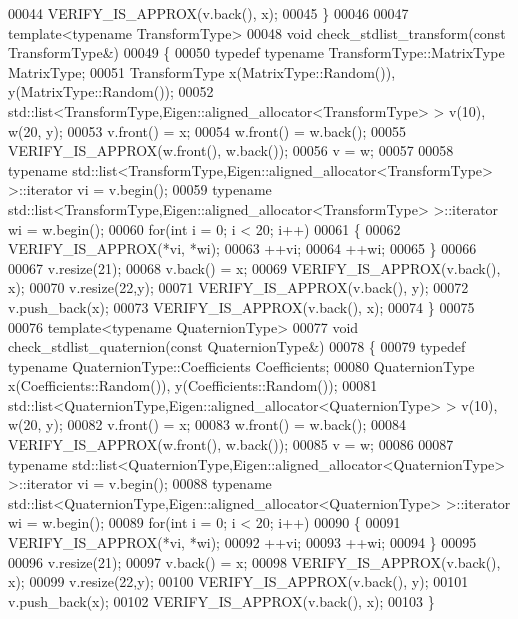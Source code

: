 \begin{DoxyCode}
00044   VERIFY\_IS\_APPROX(v.back(), x);
00045 \}
00046 
00047 \textcolor{keyword}{template}<\textcolor{keyword}{typename} TransformType>
00048 \textcolor{keywordtype}{void} check\_stdlist\_transform(\textcolor{keyword}{const} TransformType&)
00049 \{
00050   \textcolor{keyword}{typedef} \textcolor{keyword}{typename} TransformType::MatrixType MatrixType;
00051   TransformType x(MatrixType::Random()), y(MatrixType::Random());
00052   std::list<TransformType,Eigen::aligned\_allocator<TransformType> > v(10), w(20, y);
00053   v.front() = x;
00054   w.front() = w.back();
00055   VERIFY\_IS\_APPROX(w.front(), w.back());
00056   v = w;
00057 
00058   \textcolor{keyword}{typename} std::list<TransformType,Eigen::aligned\_allocator<TransformType> >::iterator vi = v.begin();
00059   \textcolor{keyword}{typename} std::list<TransformType,Eigen::aligned\_allocator<TransformType> >::iterator wi = w.begin();
00060   \textcolor{keywordflow}{for}(\textcolor{keywordtype}{int} i = 0; i < 20; i++)
00061   \{
00062     VERIFY\_IS\_APPROX(*vi, *wi);
00063     ++vi;
00064     ++wi;
00065   \}
00066 
00067   v.resize(21);
00068   v.back() = x;
00069   VERIFY\_IS\_APPROX(v.back(), x);
00070   v.resize(22,y);
00071   VERIFY\_IS\_APPROX(v.back(), y);
00072   v.push\_back(x);
00073   VERIFY\_IS\_APPROX(v.back(), x);
00074 \}
00075 
00076 \textcolor{keyword}{template}<\textcolor{keyword}{typename} QuaternionType>
00077 \textcolor{keywordtype}{void} check\_stdlist\_quaternion(\textcolor{keyword}{const} QuaternionType&)
00078 \{
00079   \textcolor{keyword}{typedef} \textcolor{keyword}{typename} QuaternionType::Coefficients Coefficients;
00080   QuaternionType x(Coefficients::Random()), y(Coefficients::Random());
00081   std::list<QuaternionType,Eigen::aligned\_allocator<QuaternionType> > v(10), w(20, y);
00082   v.front() = x;
00083   w.front() = w.back();
00084   VERIFY\_IS\_APPROX(w.front(), w.back());
00085   v = w;
00086 
00087   \textcolor{keyword}{typename} std::list<QuaternionType,Eigen::aligned\_allocator<QuaternionType> >::iterator vi = v.begin();
00088   \textcolor{keyword}{typename} std::list<QuaternionType,Eigen::aligned\_allocator<QuaternionType> >::iterator wi = w.begin();
00089   \textcolor{keywordflow}{for}(\textcolor{keywordtype}{int} i = 0; i < 20; i++)
00090   \{
00091     VERIFY\_IS\_APPROX(*vi, *wi);
00092     ++vi;
00093     ++wi;
00094   \}
00095 
00096   v.resize(21);
00097   v.back() = x;
00098   VERIFY\_IS\_APPROX(v.back(), x);
00099   v.resize(22,y);
00100   VERIFY\_IS\_APPROX(v.back(), y);
00101   v.push\_back(x);
00102   VERIFY\_IS\_APPROX(v.back(), x);
00103 \}

\end{DoxyCode}
